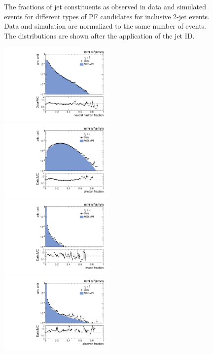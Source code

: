 \begin{figure}[!htbp]
\begin{center}
 \caption{The fractions of jet constituents as observed in data and simulated events for different types of PF candidates for inclusive 2-jet events. Data and simulation are normalized to the same number of events. The distributions are shown after the application of the jet ID.}
 \label{fig:qual2}
 \end{center}
\end{figure} 

\begin{figure}[!htbp]
 \begin{center}
 \includegraphics[width=0.5\textwidth]{Plots_HT_2_150/Comparison_NuHadFrac_3_HT_2_150.pdf}%
 ~~\includegraphics[width=0.5\textwidth]{Plots_HT_2_150/Comparison_PhFrac_3_HT_2_150.pdf}\\
 \includegraphics[width=0.5\textwidth]{Plots_HT_2_150/Comparison_MuFrac_3_HT_2_150.pdf}%
 ~~\includegraphics[width=0.5\textwidth]{Plots_HT_2_150/Comparison_ElFrac_3_HT_2_150.pdf}\\

\end{center}
\end{figure}
